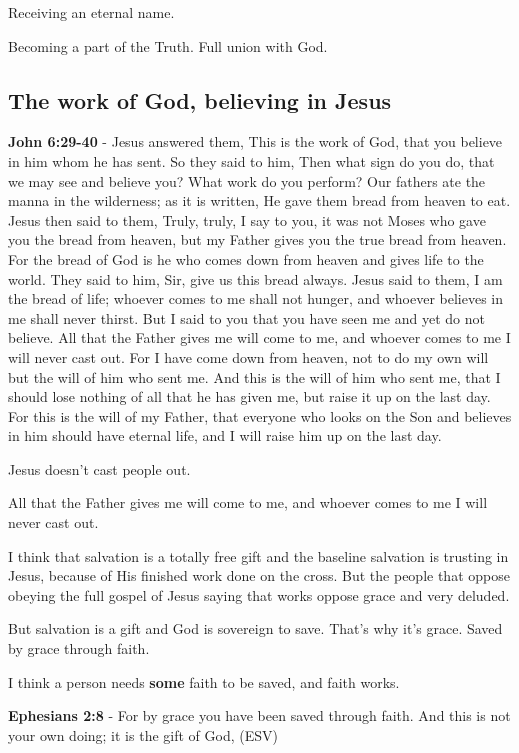 \documentclass[11pt]{article}
\begin{document}
Receiving an eternal name.

Becoming a part of the Truth.
Full union with God.

\subsection{The work of God, believing in Jesus}
\label{sec:org8b00399}
\textbf{John 6:29-40} - Jesus answered them, This is the work of God, that you believe in him whom he has sent. So they said to him, Then what sign do you do, that we may see and believe you? What work do you perform? Our fathers ate the manna in the wilderness; as it is written, He gave them bread from heaven to eat. Jesus then said to them, Truly, truly, I say to you, it was not Moses who gave you the bread from heaven, but my Father gives you the true bread from heaven. For the bread of God is he who comes down from heaven and gives life to the world. They said to him, Sir, give us this bread always. Jesus said to them, I am the bread of life; whoever comes to me shall not hunger, and whoever believes in me shall never thirst. But I said to you that you have seen me and yet do not believe. All that the Father gives me will come to me, and whoever comes to me I will never cast out. For I have come down from heaven, not to do my own will but the will of him who sent me. And this is the will of him who sent me, that I should lose nothing of all that he has given me, but raise it up on the last day. For this is the will of my Father, that everyone who looks on the Son and believes in him should have eternal life, and I will raise him up on the last day.

Jesus doesn't cast people out.

All that the Father gives me will come to me, and whoever comes to me I will
never cast out.

I think that salvation is a totally free gift and the baseline salvation is trusting in Jesus, because of His
finished work done on the cross. But the people that oppose obeying the full gospel of Jesus saying that works oppose grace and very deluded.

But salvation is a gift and God is sovereign to save.
That's why it's grace.
Saved by grace through faith.

I think a person needs \textbf{some} faith to be saved, and faith works.

\textbf{Ephesians 2:8} - For by grace you have been saved through faith. And this is not your own doing; it is the gift of God, (ESV)
\end{document}
